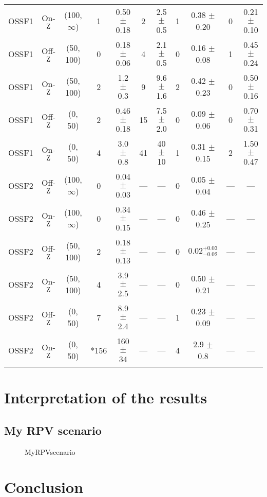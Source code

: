 \begin{sidewaystable*}[!hbtp]
\begin{tabular}{ccc|cc|cc|cc|cc}
OSSF1 & On-$\mathrm{Z}$ & (100, $\infty$) & 1 & 0.50 $\pm$ 0.18 & 2 & 2.5 $\pm$ 0.5 & 1 & 0.38 $\pm$ 0.20 & 0 & 0.21 $\pm$ 0.10 \\
OSSF1 & Off-$\mathrm{Z}$ & (50, 100) & 0 & 0.18 $\pm$ 0.06 & 4 & 2.1 $\pm$ 0.5 & 0 & 0.16 $\pm$ 0.08 & 1 & 0.45 $\pm$ 0.24 \\
OSSF1 & On-$\mathrm{Z}$ & (50, 100) & 2 & 1.2 $\pm$ 0.3 & 9 & 9.6 $\pm$ 1.6 & 2 & 0.42 $\pm$ 0.23 & 0 & 0.50 $\pm$ 0.16 \\
OSSF1 & Off-$\mathrm{Z}$ & (0, 50) & 2 & 0.46 $\pm$ 0.18 & 15 & 7.5 $\pm$ 2.0 & 0 & 0.09 $\pm$ 0.06 & 0 & 0.70 $\pm$ 0.31 \\
OSSF1 & On-$\mathrm{Z}$ & (0, 50) & 4 & 3.0 $\pm$ 0.8 & 41 & 40 $\pm$ 10 & 1 & 0.31 $\pm$ 0.15 & 2 & 1.50 $\pm$ 0.47 \\
OSSF2 & Off-$\mathrm{Z}$ & (100, $\infty$) & 0 & 0.04 $\pm$ 0.03 & --- & --- & 0 & 0.05 $\pm$ 0.04 & --- & --- \\
OSSF2 & On-$\mathrm{Z}$ & (100, $\infty$) & 0 & 0.34 $\pm$ 0.15 & --- & --- & 0 & 0.46 $\pm$ 0.25 & --- & --- \\
OSSF2 & Off-$\mathrm{Z}$ & (50, 100) & 2 & 0.18 $\pm$ 0.13 & --- & --- & 0 &$0.02^{+0.03}_{-0.02}$ & --- & --- \\
OSSF2 & On-$\mathrm{Z}$ & (50, 100) & 4 & 3.9 $\pm$ 2.5 & --- & --- & 0 & 0.50 $\pm$ 0.21 & --- & --- \\
OSSF2 & Off-$\mathrm{Z}$ & (0, 50) & 7 & 8.9 $\pm$ 2.4 & --- & --- & 1 & 0.23 $\pm$ 0.09 & --- & --- \\
OSSF2 & On-$\mathrm{Z}$ & (0, 50) & *156 & 160 $\pm$ 34 & --- & --- & 4 & 2.9 $\pm$ 0.8 & --- & --- \\
\hline \hline
\end{tabular}
\end{sidewaystable*}



\section{Interpretation of the results}
\label{sec:Interpretation}


\subsection{My RPV scenario}
\label{sec:MyRPVscenario}


\begin{figure*}[!hbtp]
\centering
\caption{MyRPVscenario}
\label{fig:MyRPVscenario}
\end{figure*}

\section{Conclusion}
\label{sec:Conclusion}